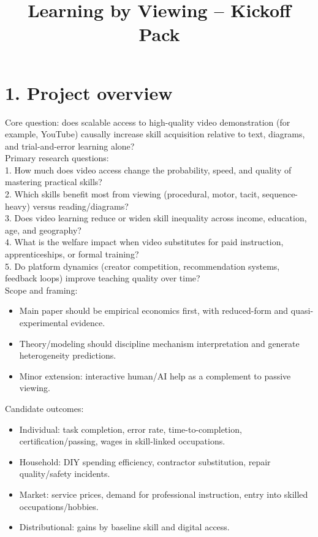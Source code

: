 \documentclass[11pt]{article}
\title{Learning by Viewing -- Kickoff Pack}
\date{}
\begin{document}
\maketitle
\section*{1. Project overview}
Core question: does scalable access to high-quality video demonstration (for example, YouTube) causally increase skill acquisition relative to text, diagrams, and trial-and-error learning alone?\\

Primary research questions:\\
1. How much does video access change the probability, speed, and quality of mastering practical skills?\\
2. Which skills benefit most from viewing (procedural, motor, tacit, sequence-heavy) versus reading/diagrams?\\
3. Does video learning reduce or widen skill inequality across income, education, age, and geography?\\
4. What is the welfare impact when video substitutes for paid instruction, apprenticeships, or formal training?\\
5. Do platform dynamics (creator competition, recommendation systems, feedback loops) improve teaching quality over time?\\

Scope and framing:\\
\begin{itemize}
\item Main paper should be empirical economics first, with reduced-form and quasi-experimental evidence.
\item Theory/modeling should discipline mechanism interpretation and generate heterogeneity predictions.
\item Minor extension: interactive human/AI help as a complement to passive viewing.
\end{itemize}

Candidate outcomes:\\
\begin{itemize}
\item Individual: task completion, error rate, time-to-completion, certification/passing, wages in skill-linked occupations.
\item Household: DIY spending efficiency, contractor substitution, repair quality/safety incidents.
\item Market: service prices, demand for professional instruction, entry into skilled occupations/hobbies.
\item Distributional: gains by baseline skill and digital access.
\end{itemize}
\end{document}
